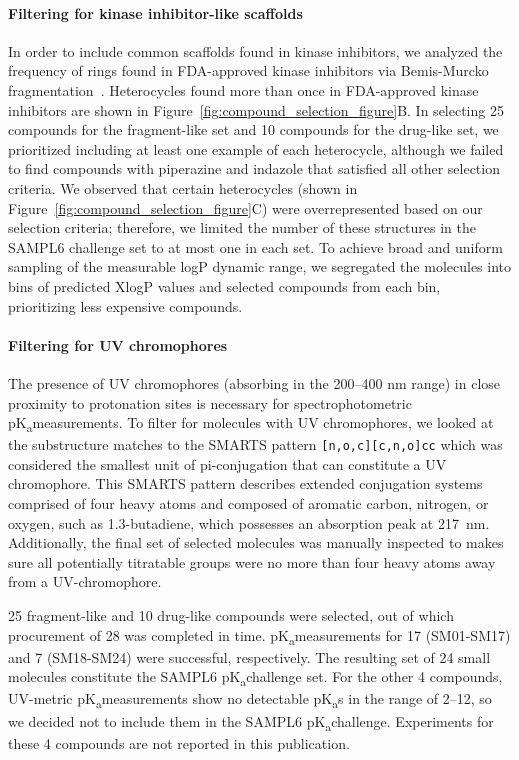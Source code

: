 \documentclass[9pt,lineno]{elife}
\newcommand{\pKa}{pK\textsubscript{a}}
\begin{document}
\paragraph{Filtering for kinase inhibitor-like scaffolds}

In order to include common scaffolds found in kinase inhibitors, we analyzed the frequency of rings found in FDA-approved kinase inhibitors via Bemis-Murcko fragmentation~\citep{bemis_properties_1996, oemedchemtk_openeye_2017}. 
Heterocycles found more than once in FDA-approved kinase inhibitors are shown in Figure~\ref{fig:compound_selection_figure}B. 
In selecting 25 compounds for the fragment-like set and 10 compounds for the drug-like set, we prioritized including at least one example of each heterocycle, although we failed to find compounds with piperazine and indazole that satisfied all other selection criteria. 
We observed that certain heterocycles (shown in Figure~\ref{fig:compound_selection_figure}C) were overrepresented based on our selection criteria; therefore, we limited the number of these structures in the SAMPL6 challenge set to at most one in each set.
To achieve broad and uniform sampling of the measurable logP dynamic range, we segregated the molecules into bins of predicted XlogP values and selected compounds from each bin, prioritizing less expensive compounds. 

\paragraph{Filtering for UV chromophores}

The presence of UV chromophores (absorbing in the 200--400 nm range) in close proximity to protonation sites is necessary for spectrophotometric \pKa measurements. 
To filter for molecules with UV chromophores, we looked at the substructure matches to the SMARTS pattern \texttt{[n,o,c][c,n,o]cc} which was considered the smallest unit of pi-conjugation that can constitute a UV chromophore. 
This SMARTS pattern describes extended conjugation systems comprised of four heavy atoms and composed of aromatic carbon, nitrogen, or oxygen, such as 1.3-butadiene, which possesses an absorption peak at 217~nm. 
Additionally, the final set of selected molecules was manually inspected to makes sure all potentially titratable groups were no more than four heavy atoms away from a UV-chromophore.

25 fragment-like and 10 drug-like compounds were selected, out of which procurement of 28 was completed in time. \pKa measurements for 17 (SM01-SM17) and 7 (SM18-SM24) were successful, respectively. The resulting set of 24 small molecules constitute the SAMPL6 \pKa challenge set.
For the other 4 compounds, UV-metric \pKa measurements show no detectable \pKa s in the range of 2--12, so we decided not to include them in the SAMPL6 \pKa challenge. Experiments for these 4 compounds are not reported in this publication. 
\end{document}
